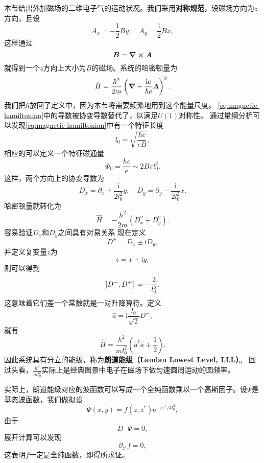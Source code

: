\documentclass[UTF8, a4paper]{ctexart}
\newcommand*{\ee}{\mathrm{e}}
\newcommand*{\ii}{\mathrm{i}}
\begin{document}
本节给出外加磁场的二维电子气的运动状况。我们采用\textbf{对称规范}，设磁场方向为$z$方向，且设
\begin{equation}
    A_x = - \frac{1}{2} B y, \quad A_y = \frac{1}{2} B x,
\end{equation}
这样通过
\[
    \vb*{B} = \curl{\vb*{A}}
\]
就得到一个$z$方向上大小为$B$的磁场。系统的哈密顿量为
\begin{equation}
    \hat{H} = \frac{\hbar^2}{2m} \left( \grad - \frac{\ii e}{\hbar c} \vb*{A} \right)^2.
    \label{eq:magnetic-hamiltonian}
\end{equation}
我们把$\hbar$放回了定义中，因为本节将需要频繁地用到这个能量尺度。
\eqref{eq:magnetic-hamiltonian}中的导数被协变导数替代了，以满足$U(1)$对称性。
通过量纲分析可以发现\eqref{eq:magnetic-hamiltonian}中有一个特征长度
\begin{equation}
    l_0 = \sqrt{\frac{\hbar c}{e B}},
\end{equation}
相应的可以定义一个特征磁通量
\begin{equation}
    \Phi_0 = \frac{h c}{e} \sim 2 B \pi l_0^2.
\end{equation}
这样，两个方向上的协变导数为
\begin{equation}
    D_x = \partial_x + \frac{\ii}{2l_0^2} y, \quad D_y = \partial_y - \frac{\ii}{2l_0^2}x.
\end{equation}
哈密顿量就转化为
\[
    \hat{H} = - \frac{\hbar^2}{2m} (D_x^2 + D_y^2).
\]
容易验证$D_x$和$D_y$之间具有对易关系
现在定义
\begin{equation}
    D^\pm = D_x \pm \ii D_y,
\end{equation}
并定义复变量$z$为
\begin{equation}
    z = x + \ii y,
\end{equation}
则可以得到
\begin{equation}
    \comm*{D^-}{D^+} = - \frac{2}{l_0^2}.
\end{equation}
这意味着它们差一个常数就是一对升降算符。定义
\begin{equation}
    \hat{a} = \ii \frac{l_0}{\sqrt{2}} D^-,
\end{equation}
就有
\begin{equation}
    \hat{H} = \frac{\hbar^2}{m l_0^2} \left(\hat{a}^\dagger \hat{a} + \frac{1}{2} \right).
\end{equation}
因此系统具有分立的能级，称为\textbf{朗道能级（Landau Lowest Level, LLL）}。
回过头看，$\frac{\hbar^2}{m l_0^2}$实际上是经典图景中电子在磁场下做匀速圆周运动的圆频率。

实际上，朗道能级对应的波函数可以写成一个全纯函数乘以一个高斯因子。设$\Psi$是基态波函数，我们做拟设
\begin{equation}
    \Psi(x, y) = f(z, z^*) \ee^{- z z^* / 4l_0^2},
    \label{eq:landau-wave-packet}
\end{equation}
由于
\[
    D^- \Psi = 0,
\]
展开计算可以发现
\[
    \partial_{z^*} f = 0,
\]
这表明$f$一定是全纯函数，即得所求证。
\end{document}
